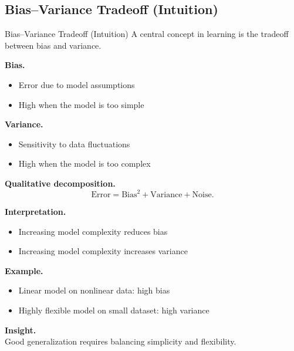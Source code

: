 \documentclass[aspectratio=169,11pt]{beamer}
\begin{document}
\subsection{Bias--Variance Tradeoff (Intuition)}
\begin{frame}[t,allowframebreaks]{Bias--Variance Tradeoff (Intuition)}
\small
A central concept in learning is the tradeoff between bias and variance.

\textbf{Bias.}\\ \begin{itemize}
    \item Error due to model assumptions
    \item High when the model is too simple
\end{itemize}

\textbf{Variance.}\\ \begin{itemize}
    \item Sensitivity to data fluctuations
    \item High when the model is too complex
\end{itemize}

\textbf{Qualitative decomposition.}\\ \[
\text{Error} = \text{Bias}^2 + \text{Variance} + \text{Noise}.
\]

\textbf{Interpretation.}\\ \begin{itemize}
    \item Increasing model complexity reduces bias
    \item Increasing model complexity increases variance
\end{itemize}

\textbf{Example.}\\ \begin{itemize}
    \item Linear model on nonlinear data: high bias
    \item Highly flexible model on small dataset: high variance
\end{itemize}

\textbf{Insight.}\\ Good generalization requires balancing simplicity and flexibility.
\end{frame}
\end{document}
